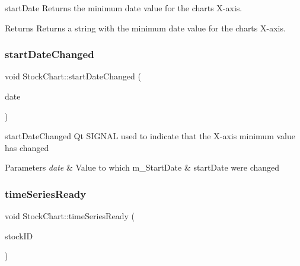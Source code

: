 start\+Date Returns the minimum date value for the chart\textquotesingle{}s X-\/axis. 

\begin{DoxyReturn}{Returns}
Returns a string with the minimum date value for the chart\textquotesingle{}s X-\/axis. 
\end{DoxyReturn}
\mbox{\label{class_stock_chart_a4f0cf491de4e546621bac94bec52abc2}} 
\subsubsection{\texorpdfstring{start\+Date\+Changed}{startDateChanged}}
{\footnotesize\ttfamily void Stock\+Chart\+::start\+Date\+Changed (\begin{DoxyParamCaption}\item[{const Q\+String \&}]{date }\end{DoxyParamCaption})\hspace{0.3cm}{\ttfamily [signal]}}



start\+Date\+Changed Qt S\+I\+G\+N\+AL used to indicate that the X-\/axis minimum value has changed 


\begin{DoxyParams}{Parameters}
{\em date} & Value to which m\+\_\+\+Start\+Date \& start\+Date were changed \\
\hline
\end{DoxyParams}
\mbox{\label{class_stock_chart_a9065188a2340a471d3db38fdd1763411}} 
\subsubsection{\texorpdfstring{time\+Series\+Ready}{timeSeriesReady}}
{\footnotesize\ttfamily void Stock\+Chart\+::time\+Series\+Ready (\begin{DoxyParamCaption}\item[{Q\+String}]{stock\+ID }\end{DoxyParamCaption})\hspace{0.3cm}{\ttfamily [signal]}}



